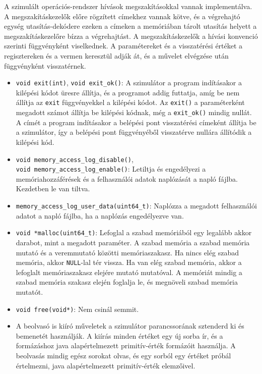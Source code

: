 \documentclass[12pt]{report}
\begin{document}
A szimulált operációs-rendszer hívások megszakításokkal vannak implementálva.
A megszakításkezelők előre rögzített címekhez vannak kötve,
és a végrehajtó egység utasítás-dekódere
ezeken a címeken a memóriában tárolt utasítás helyett
a megszakításkezelőre bízza a végrehajtást.
A megszakításkezelők a hívási konvenció szerinti függvényként viselkednek.
A paramétereket és a visszatérési értéket a regisztereken és a vermen keresztül
adják át, és a művelet elvégzése után függvényként visszatérnek.
\begin{itemize}
\item \texttt{void exit(int)}, \texttt{void exit\_ok()}:
A szimulátor a program indításakor a kilépési kódot üresre állítja,
és a programot addig futtatja,
amíg be nem állítja az \texttt{exit} függvényekkel a kilépési kódot.
Az \texttt{exit()} a paraméterként megadott számot állítja be kilépési kódnak,
még a \texttt{exit\_ok()} mindig nullát.
A  címét a program indításakor a belépési pont
visszatérési címeként állítja be a szimulátor,
így a belépési pont függvényéből
visszatérve nullára állítódik a kilépési kód.

\item \texttt{void memory\_access\_log\_disable()}, \\
\texttt{void memory\_access\_log\_enable()}:
Letiltja és engedélyezi a memóriahozzáférések és a felhasználói adatok
naplózását a napló fájlba.
Kezdetben le van tiltva.

\item \texttt{memory\_access\_log\_user\_data(uint64\_t)}:
Naplózza a megadott felhasználói adatot a napló fájlba,
ha a naplózás engedélyezve van.

\item \texttt{void *malloc(uint64\_t)}:
Lefoglal a szabad memóriából egy legalább akkor darabot,
mint a megadott paraméter.
A szabad memória a szabad memória mutató és a veremmutató
közötti memóriaszakasz.
Ha nincs elég szabad memória, akkor \texttt{NULL}-lal tér vissza.
Ha van elég szabad memória, akkor a lefoglalt memóriaszakasz elejére
mutató mutatóval.
A memóriát mindig a szabad memória szakasz elején foglalja le,
és megnöveli szabad memória mutatót.

\item \texttt{void free(void*)}: Nem csinál semmit.

\item A beolvasó is kiíró műveletek a szimulátor parancssorának
sztenderd ki és bemenetét használják.
A kiírás minden értéket egy új sorba ír,
és a formázáshoz java alapértelmezett primitív-érték formázóit használja.
A beolvasás mindig egész sorokat olvas,
és egy sorból egy értéket próbál értelmezni,
java alapértelmezett primitív-érték elemzőivel.
\end{itemize}
\end{document}
